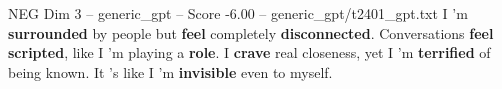 \begin{textsample}{NEG Dim 3 – generic\_gpt – Score -6.00 – generic\_gpt/t2401\_gpt.txt}  \label{ex:f3_neg_009}
I ’m \textbf{surrounded} by people but \textbf{feel} completely \textbf{disconnected}.
Conversations \textbf{feel} \textbf{scripted}, like I ’m playing a \textbf{role}.
I \textbf{crave} real closeness, yet I ’m \textbf{terrified} of being known.
It ’s like I ’m \textbf{invisible} even to myself.

\end{textsample}
